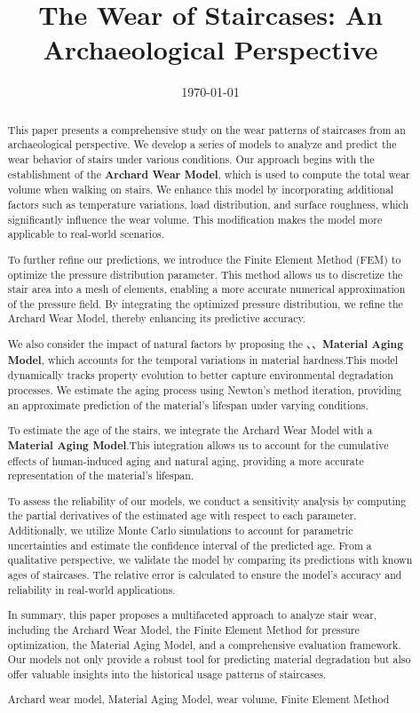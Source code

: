 \documentclass{mcmthesis}
\title{The Wear of Staircases: An Archaeological Perspective}
\date{\today}
\begin{document}
\begin{abstract}
\hspace{1.5em}This paper presents a comprehensive study on the wear patterns of staircases from an archaeological perspective. We develop a series of models to analyze and predict the wear behavior of stairs under various conditions. Our approach begins with the establishment of the \textbf{Archard Wear Model}, which is used to compute the total wear volume when walking on stairs. We enhance this model by incorporating additional factors such as temperature variations, load distribution, and surface roughness, which significantly influence the wear volume. This modification makes the model more applicable to real-world scenarios.

To further refine our predictions, we introduce the Finite Element Method (FEM) to optimize the pressure distribution parameter. This method allows us to discretize the stair area into a mesh of elements, enabling a more accurate numerical approximation of the pressure field. By integrating the optimized pressure distribution, we refine the Archard Wear Model, thereby enhancing its predictive accuracy.

We also consider the impact of natural factors by proposing the 、、\textbf{Material Aging Model}, which accounts for the temporal variations in material hardness.This model dynamically tracks property evolution to better capture environmental degradation processes. We estimate the aging process using Newton’s method iteration, providing an approximate prediction of the material’s lifespan under varying conditions.

To estimate the age of the stairs, we integrate the Archard Wear Model with a \textbf{Material Aging Model}.This integration allows us to account for the cumulative effects of human-induced aging and natural aging, providing a more accurate representation of the material's lifespan.

To assess the reliability of our models, we conduct a sensitivity analysis by computing the partial derivatives of the estimated age with respect to each parameter. Additionally, we utilize Monte Carlo simulations to account for parametric uncertainties and estimate the confidence interval of the predicted age. From a qualitative perspective, we validate the model by comparing its predictions with known ages of staircases. The relative error is calculated to ensure the model’s accuracy and reliability in real-world applications.

In summary, this paper proposes a multifaceted approach to analyze stair wear, including the Archard Wear Model, the Finite Element Method for pressure optimization, the Material Aging Model, and a comprehensive evaluation framework. Our models not only provide a robust tool for predicting material degradation but also offer valuable insights into the historical usage patterns of staircases.

\hspace{1.5em} \begin{keywords}
Archard wear model, Material Aging Model, wear volume, Finite Element Method
\end{keywords}

\end{abstract}
\end{document}
